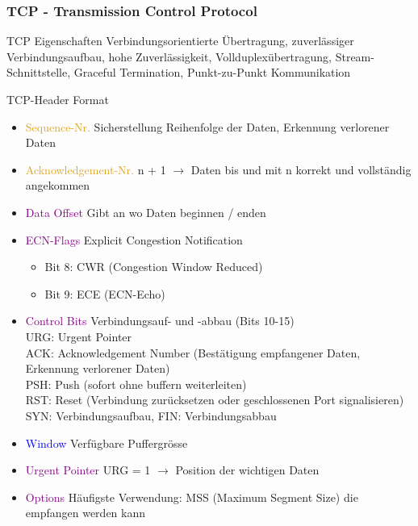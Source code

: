\subsubsection{TCP - Transmission Control Protocol}

\begin{definition}{TCP Eigenschaften} 
    Verbindungsorientierte Übertragung, zuverlässiger Verbindungsaufbau, hohe Zuverlässigkeit, Vollduplexübertragung, Stream-Schnittstelle, Graceful Termination, Punkt-zu-Punkt Kommunikation
\end{definition}

\begin{concept}{TCP-Header Format}
    \begin{itemize}
        \item \textcolor{Goldenrod}{Sequence-Nr.} Sicherstellung Reihenfolge der Daten, Erkennung verlorener Daten
        \item \textcolor{Goldenrod}{Acknowledgement-Nr.} n + 1 $\rightarrow$ Daten bis und mit n korrekt und vollständig angekommen
        \item \textcolor{purple}{Data Offset} Gibt an wo Daten beginnen / enden
        \item \textcolor{purple}{ECN-Flags} Explicit Congestion Notification
        \begin{itemize}
            \item Bit 8: CWR (Congestion Window Reduced)
            \item Bit 9: ECE (ECN-Echo)
        \end{itemize}
        \item \textcolor{purple}{Control Bits} Verbindungsauf- und -abbau (Bits 10-15)\\
        URG: Urgent Pointer\\
        ACK: Acknowledgement Number (Bestätigung empfangener Daten, Erkennung verlorener Daten)\\
        PSH: Push (sofort ohne buffern weiterleiten)\\
        RST: Reset (Verbindung zurücksetzen oder geschlossenen Port signalisieren)\\
        SYN: Verbindungsaufbau,
        FIN: Verbindungsabbau
        \item \textcolor{blue}{Window} Verfügbare Puffergrösse 
        \item \textcolor{purple}{Urgent Pointer} URG = 1 $\rightarrow$ Position der wichtigen Daten
        \item \textcolor{purple}{Options} Häufigste Verwendung: MSS (Maximum Segment Size) die empfangen werden kann

\end{itemize}
\end{concept}
